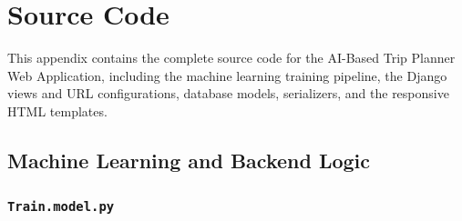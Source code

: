 \chapter{Source Code}
\label{ch:source-code}

This appendix contains the complete source code for the AI-Based Trip Planner Web Application, including the machine learning training pipeline, the Django views and URL configurations, database models, serializers, and the responsive HTML templates.

\section{Machine Learning and Backend Logic}


\subsection{\texttt{Train.model.py}}
